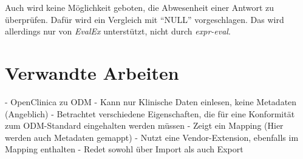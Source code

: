 Auch wird keine Möglichkeit geboten, die Abwesenheit einer Antwort zu überprüfen. Dafür wird ein Vergleich mit \enquote{NULL} vorgeschlagen.
Das wird allerdings nur von \textit{EvalEx} unterstützt, nicht durch \textit{expr-eval}.

\section{Verwandte Arbeiten}

- OpenClinica zu ODM
	- Kann nur Klinische Daten einlesen, keine Metadaten (Angeblich)
	- Betrachtet verschiedene Eigenschaften, die für eine Konformität zum ODM-Standard eingehalten werden müssen
	- Zeigt ein Mapping (Hier werden auch Metadaten gemappt)
	- Nutzt eine Vendor-Extension, ebenfalls im Mapping enthalten
	- Redet sowohl über Import als auch Export
